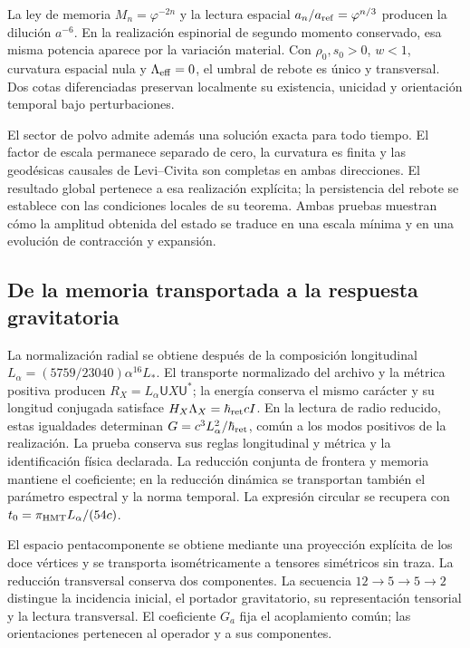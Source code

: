 La ley de memoria \(M_n=\varphi^{-2n}\) y la lectura espacial
\(a_n/a_{\rm ref}=\varphi^{n/3}\) producen la dilución
\(a^{-6}\). En la realización espinorial de segundo momento
conservado, esa misma potencia aparece por la variación material.
Con \(\rho_0,s_0>0\), \(w<1\), curvatura espacial nula y
\(\Lambda_{\rm eff}=0\), el umbral de rebote es único y
transversal. Dos cotas diferenciadas preservan localmente su
existencia, unicidad y orientación temporal bajo perturbaciones.

El sector de polvo admite además una solución exacta para todo
tiempo. El factor de escala permanece separado de cero, la
curvatura es finita y las geodésicas causales de Levi--Civita
son completas en ambas direcciones. El resultado global pertenece
a esa realización explícita; la persistencia del rebote se
establece con las condiciones locales de su teorema. Ambas
pruebas muestran cómo la amplitud obtenida del estado se traduce
en una escala mínima y en una evolución de contracción y expansión.

\subsection{De la memoria transportada a la respuesta gravitatoria}

La normalización radial se obtiene después de la composición longitudinal
\(L_\alpha=(5759/23040)\alpha^{16}L_*\). El transporte normalizado
del archivo y la métrica positiva producen
\(R_X=L_\alpha\mathsf U X\mathsf U^*\); la energía conserva el mismo
carácter y su longitud conjugada satisface
\(H_X\Lambda_X=\hbar_{\rm ret}cI\). En la lectura de radio reducido,
estas igualdades determinan \(G=c^3L_\alpha^2/\hbar_{\rm ret}\), común
a los modos positivos de la realización. La prueba conserva sus reglas
longitudinal y métrica y la identificación física declarada. La reducción
conjunta de frontera y memoria mantiene el coeficiente; en la reducción
dinámica se transportan también el parámetro espectral y la norma temporal.
La expresión circular se recupera con
\(t_0=\pi_{\rm HMT}L_\alpha/(54c)\).

El espacio pentacomponente se obtiene mediante una proyección explícita
de los doce vértices y se transporta isométricamente a tensores
simétricos sin traza. La reducción transversal conserva dos componentes.
La secuencia \(12\to5\to5\to2\) distingue la incidencia inicial,
el portador gravitatorio, su representación tensorial y la lectura
transversal. El coeficiente \(G_a\) fija el acoplamiento común;
las orientaciones pertenecen al operador y a sus componentes.

